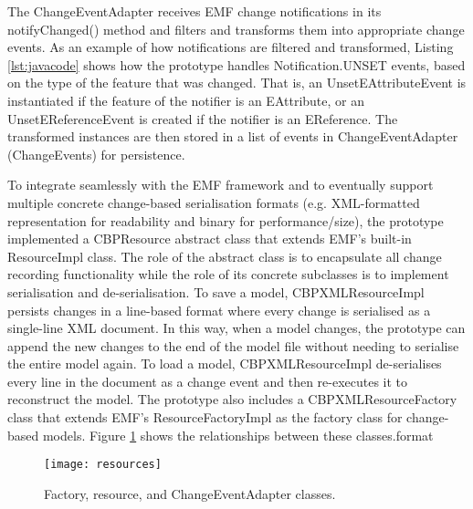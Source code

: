 The \textsf{ChangeEventAdapter} receives EMF change notifications in its \textsf{notifyChanged()} method and filters and transforms them into appropriate change events. As an example of how notifications are filtered and transformed, Listing \ref{lst:javacode} shows how the prototype handles \textsf{Notification.UNSET} events, based on the type of the feature that was changed. That is, an \textsf{UnsetEAttributeEvent} is instantiated if the feature of the notifier is an \textsf{EAttribute}, or an \textsf{UnsetEReferenceEvent} is created if the notifier is an \textsf{EReference}. The transformed instances are then stored in a list of events in \textsf{ChangeEventAdapter} (\textsf{ChangeEvents}) for persistence.

To integrate seamlessly with the EMF framework and to eventually support multiple concrete change-based serialisation formats (e.g. XML-formatted representation for readability and binary for performance/size), the prototype implemented a \textsf{CBPResource} abstract class that extends EMF’s built-in \textsf{ResourceImpl} class. The role of the abstract class is to encapsulate all change recording functionality while the role of its concrete subclasses is to implement serialisation and de-serialisation.
To save a model, \textsf{CBPXMLResourceImpl} persists changes in a line-based format where every change is serialised as a single-line XML document. In this way, when a model changes, the prototype can append the new changes to the end of the model file without needing to serialise the entire model again.
To load a model, \textsf{CBPXMLResourceImpl} de-serialises every line in the document as a change event and then re-executes it to reconstruct the model.
The prototype also includes a \textsf{CBPXMLResourceFactory} class that extends EMF’s \textsf{ResourceFactoryImpl} as the factory class for change-based models. Figure \ref{fig:resources} shows the relationships between these classes.format 

\begin{figure}[th]
  \centering
  \texttt{[image: resources]}
  \caption{Factory, resource, and ChangeEventAdapter classes.}
  \label{fig:resources}
\end{figure}

